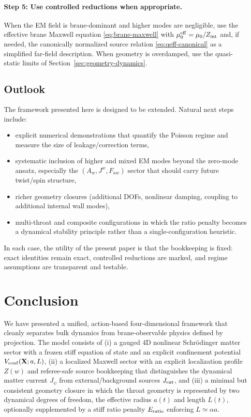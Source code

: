 \documentclass[11pt]{article}
\newcommand{\Zint}{Z_{\rm int}}
\begin{document}
\paragraph{Step 5: Use controlled reductions when appropriate.}
When the EM field is brane-dominant and higher modes are negligible, use the effective brane Maxwell equation \eqref{eq:brane-maxwell} with $\mu_0^{\rm eff}=\mu_0/\Zint$ and, if needed, the canonically normalized source relation \eqref{eq:qeff-canonical} as a simplified far-field description. When geometry is overdamped, use the quasi-static limits of Section~\ref{sec:geometry-dynamics}.

\subsection{Outlook}
\label{sec:discussion-outlook}

The framework presented here is designed to be extended. Natural next steps include:
\begin{itemize}[leftmargin=2.0em]
\item explicit numerical demonstrations that quantify the Poisson regime and measure the size of leakage/correction terms,
\item systematic inclusion of higher and mixed EM modes beyond the zero-mode ansatz, especially the $(A_w,J^w,F_{a w})$ sector that should carry future twist/spin structure,
\item richer geometry closures (additional DOFs, nonlinear damping, coupling to additional internal wall modes),
\item multi-throat and composite configurations in which the ratio penalty becomes a dynamical stability principle rather than a single-configuration heuristic.
\end{itemize}
In each case, the utility of the present paper is that the bookkeeping is fixed: exact identities remain exact, controlled reductions are marked, and regime assumptions are transparent and testable.

\section{Conclusion}
\label{sec:conclusion}

We have presented a unified, action-based four-dimensional framework that cleanly separates bulk dynamics from brane-observable physics defined by projection. The model consists of (i) a gauged 4D nonlinear Schr\"odinger matter sector with a frozen stiff equation of state and an explicit confinement potential $V_{\rm conf}(\mathbf{X};a,L)$, (ii) a localized Maxwell sector with an explicit localization profile $Z(w)$ and referee-safe source bookkeeping that distinguishes the dynamical matter current $J_\psi$ from external/background sources $J_{\rm ext}$, and (iii) a minimal but consistent geometry closure in which the throat geometry is represented by two dynamical degrees of freedom, the effective radius $a(t)$ and length $L(t)$, optionally supplemented by a stiff ratio penalty $E_{\rm ratio}$ enforcing $L\simeq \alpha a$.
\end{document}

